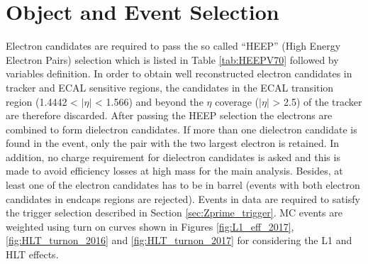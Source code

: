 \section{Object and Event Selection}\label{sec:Zprime_HEEP}
Electron candidates are required to pass the so called ``HEEP'' (High Energy Electron Pairs) selection which is listed in Table \ref{tab:HEEPV70} followed by variables definition. In order to obtain well reconstructed electron candidates in tracker and ECAL sensitive regions, the candidates in the ECAL transition region (1.4442 < $|\eta|$ < 1.566) and beyond the $\eta$ coverage ($|\eta|$ > 2.5) of the tracker are therefore discarded.
After passing the HEEP selection the electrons are combined to form dielectron candidates.
If more than one dielectron candidate is found in the event, only the pair with the two largest electron \et is retained.
In addition, no charge requirement for dielectron candidates is asked and this is made to avoid efficiency losses at high mass for the main analysis.
Besides, at least one of the electron candidates has to be in barrel (events with both electron candidates in endcaps regions are rejected).
Events in data are required to satisfy the trigger selection described in Section \ref{sec:Zprime_trigger}.
MC events are weighted using turn on curves shown in Figures \ref{fig:L1_eff_2017}, \ref{fig:HLT_turnon_2016} and \ref{fig:HLT_turnon_2017} for considering the L1 and HLT effects.


